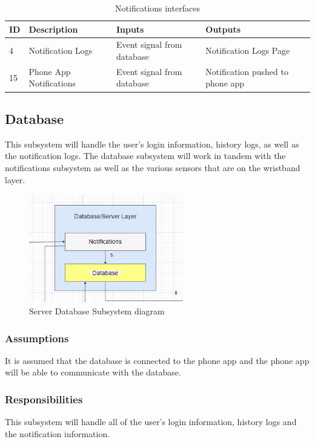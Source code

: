 \begin {table}[H]
\caption {Notifications interfaces} 
\begin{center}
    \begin{tabular}{ | p{1cm} | p{6cm} | p{3cm} | p{3cm} |}
    \hline
    ID & Description & Inputs & Outputs \\ \hline
    4 & Notification Logs & Event signal from database & Notification Logs Page \\ \hline
    15 & Phone App Notifications & Event signal from database & Notification pushed to phone app \\ \hline
    \end{tabular}
\end{center}
\end{table}

\subsection{Database}
This subsystem will handle the user's login information, history logs, as well as the notification logs. The database subsystem will work in tandem with the notifications subsystem as well as the various sensors that are on the wristband layer.

\begin{figure}[h!]
	\centering
 	\includegraphics[width=0.60\textwidth]{images/Server_Layer2}
 \caption{Server Database Subsystem diagram}
\end{figure}

\subsubsection{Assumptions}
It is assumed that the database is connected to the phone app and the phone app will be able to communicate with the database. 

\subsubsection{Responsibilities}
This subsystem will handle all of the user's login information, history logs and the notification information. 

